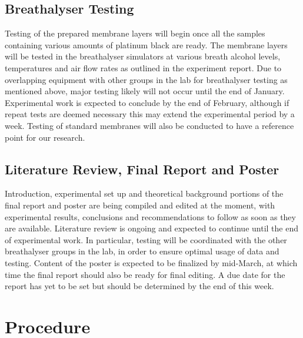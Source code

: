 \documentclass{article}
\begin{document}
		\subsection{Breathalyser Testing}
			Testing of the prepared membrane layers will begin once all the samples containing various amounts of platinum black are ready. The membrane layers will be tested in the breathalyser simulators at various breath alcohol levels, temperatures and air flow rates as outlined in the experiment report. Due to overlapping equipment with other groups in the lab for breathalyser testing as mentioned above, major testing likely will not occur until the end of January.
			Experimental work is expected to conclude by the end of February, although if repeat tests are deemed necessary this may extend the experimental period by a week. Testing of standard membranes will also be conducted to have a reference point for our research.

		\subsection{Literature Review, Final Report and Poster}
			Introduction, experimental set up and theoretical background portions of the final report and poster are being compiled and edited at the moment, with experimental results, conclusions and recommendations to follow as soon as they are available. Literature review is ongoing and expected to continue until the end of experimental work. In particular, testing will be coordinated with the other breathalyser groups in the lab, in order to ensure optimal usage of data and testing.
			Content of the poster is expected to be finalized by mid-March, at which time the final report should also be ready for final editing. A due date for the report has yet to be set but should be determined by the end of this week.
	\section{Procedure}
\end{document}

